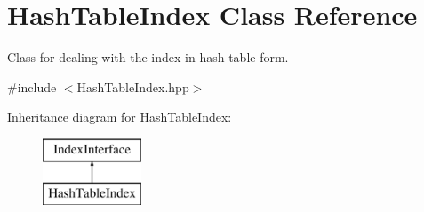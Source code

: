 \hypertarget{class_hash_table_index}{}\section{Hash\+Table\+Index Class Reference}
\label{class_hash_table_index}


Class for dealing with the index in hash table form.  




{\ttfamily \#include $<$Hash\+Table\+Index.\+hpp$>$}

Inheritance diagram for Hash\+Table\+Index\+:\begin{figure}[H]
\begin{center}
\leavevmode
\includegraphics[height=2.000000cm]{class_hash_table_index}
\end{center}
\end{figure}
